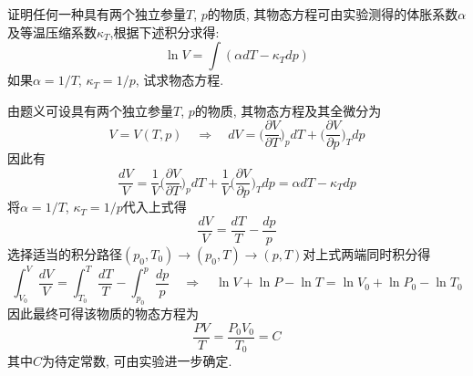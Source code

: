 \begin{problem}[1.2]
证明任何一种具有两个独立参量$T$, $p$的物质, 其物态方程可由实验测得的体胀系数$\alpha$及等温压缩系数$\kappa_{T}$,根据下述积分求得:
\[
\ln V = \int (\alpha dT - \kappa_T dp)
\]
如果$\alpha=1/T$, $\kappa_T=1/p$, 试求物态方程.
\end{problem}
\begin{solution}
由题义可设具有两个独立参量$T$, $p$的物质, 其物态方程及其全微分为
\[
V = V(T,p)
\quad\Longrightarrow\quad 
dV = \bigg(\frac{\partial V}{\partial T}\bigg)_p dT + \bigg(\frac{\partial V}{\partial p}\bigg)_T dp
\]
因此有
\[
\frac{dV}{V} = \frac{1}{V}\bigg(\frac{\partial V}{\partial T}\bigg)_p dT + \frac{1}{V}\bigg(\frac{\partial V}{\partial p}\bigg)_T dp = \alpha dT -\kappa_T dp
\]
将$\alpha=1/T$, $\kappa_T=1/p$代入上式得
\[
\frac{dV}{V} = \frac{dT}{T} - \frac{dp}{p}
\]
选择适当的积分路径$(p_0,T_0)\rightarrow(p_0,T)\rightarrow(p,T)$对上式两端同时积分得
\[
\int_{V_0}^V\frac{dV}{V} = \int_{T_0}^T \frac{dT}{T} - \int_{p_0}^p\frac{dp}{p}
\quad\Longrightarrow\quad 
\ln V  + \ln P - \ln T = \ln V_0  + \ln P_0 - \ln T_0
\]
因此最终可得该物质的物态方程为
\[
\frac{PV}{T} = \frac{P_0V_0}{T_0} = C
\]
其中$C$为待定常数, 可由实验进一步确定.
\end{solution}
